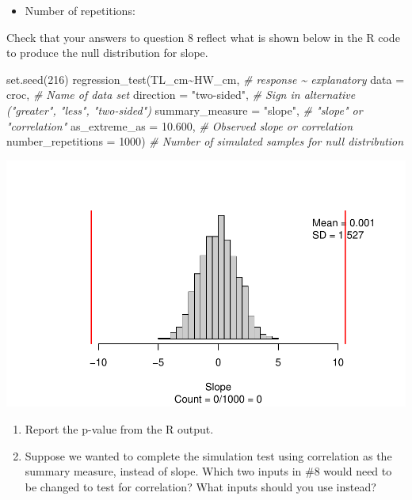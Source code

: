 \documentclass[
]{report}
\newenvironment{Shaded}{\begin{snugshade}}{\end{snugshade}}
\newcommand{\AttributeTok}[1]{\textcolor[rgb]{0.77,0.63,0.00}{#1}}
\newcommand{\CommentTok}[1]{\textcolor[rgb]{0.56,0.35,0.01}{\textit{#1}}}
\newcommand{\DecValTok}[1]{\textcolor[rgb]{0.00,0.00,0.81}{#1}}
\newcommand{\FloatTok}[1]{\textcolor[rgb]{0.00,0.00,0.81}{#1}}
\newcommand{\FunctionTok}[1]{\textcolor[rgb]{0.00,0.00,0.00}{#1}}
\newcommand{\NormalTok}[1]{#1}
\newcommand{\SpecialCharTok}[1]{\textcolor[rgb]{0.00,0.00,0.00}{#1}}
\newcommand{\StringTok}[1]{\textcolor[rgb]{0.31,0.60,0.02}{#1}}
\providecommand{\tightlist}{%
  \setlength{\itemsep}{0pt}\setlength{\parskip}{0pt}}
\begin{document}
\vspace{0.2in}

\begin{itemize}
\tightlist
\item
  Number of repetitions:
\end{itemize}

\vspace{.2in}

Check that your answers to question 8 reflect what is shown below in the R code to produce the null distribution for slope.

\begin{Shaded}
\begin{Highlighting}[]
\FunctionTok{set.seed}\NormalTok{(}\DecValTok{216}\NormalTok{)}
\FunctionTok{regression\_test}\NormalTok{(TL\_cm}\SpecialCharTok{\textasciitilde{}}\NormalTok{HW\_cm, }\CommentTok{\# response \textasciitilde{} explanatory}
               \AttributeTok{data =}\NormalTok{ croc, }\CommentTok{\# Name of data set}
               \AttributeTok{direction =} \StringTok{"two{-}sided"}\NormalTok{, }\CommentTok{\# Sign in alternative ("greater", "less", "two{-}sided")}
               \AttributeTok{summary\_measure =} \StringTok{"slope"}\NormalTok{, }\CommentTok{\# "slope" or "correlation"}
               \AttributeTok{as\_extreme\_as =} \FloatTok{10.600}\NormalTok{, }\CommentTok{\# Observed slope or correlation}
               \AttributeTok{number\_repetitions =} \DecValTok{1000}\NormalTok{) }\CommentTok{\# Number of simulated samples for null distribution}
\end{Highlighting}
\end{Shaded}

\begin{center}\includegraphics[width=0.7\linewidth]{13-OCA10-regression-simulation_files/figure-latex/unnamed-chunk-5-1} \end{center}

\begin{enumerate}
\def\labelenumi{\arabic{enumi}.}
\setcounter{enumi}{8}
\item
  Report the p-value from the R output.
  \vspace{0.5in}
\item
  Suppose we wanted to complete the simulation test using correlation as the summary measure, instead of slope. Which two inputs in \#8 would need to be changed to test for correlation? What inputs should you use instead?
  \vspace{0.75in}
\end{enumerate}
\end{document}
